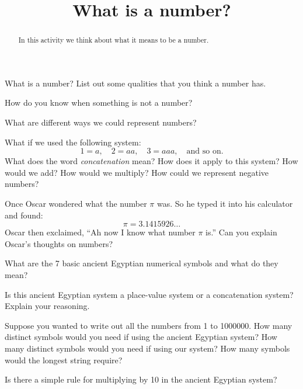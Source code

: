 \documentclass{ximera}
\title{What is a number?}
\begin{document}
\begin{abstract}
In this activity we think about what it means to be a number.
\end{abstract}
\maketitle

\begin{question}
What is a number? List out some qualities that you think a number has.
\end{question}

\begin{question}
How do you know when something is not a number?
\end{question}

\begin{question}
What are different ways we could represent numbers?
\end{question}

\begin{question}
What if we used the following system:
\[
1 = a, \quad 2 = aa, \quad 3 = aaa, \quad\text{and so on.}
\]
What does the word \textit{concatenation} mean? How does it apply to
this system?  How would we add? How would we multiply? How could we
represent negative numbers?
\end{question}


\begin{question}
Once Oscar wondered what the number $\pi$ was. So he typed it into his
calculator and found:
\[
\pi = 3.1415926\dots
\]
Oscar then exclaimed, ``Ah now I know what number $\pi$ is.'' Can you
explain Oscar's thoughts on numbers?
\end{question}


\begin{exercise}
What are the 7 basic ancient Egyptian numerical symbols and what do
they mean?
\end{exercise}


\begin{question}
Is this ancient Egyptian system a place-value system or a
concatenation system? Explain your reasoning.
\end{question}


\begin{question}
Suppose you wanted to write out all the numbers from 1 to 1000000. How
many distinct symbols would you need if using the ancient Egyptian
system? How many distinct symbols would you need if using our system?
How many symbols would the longest string require? 
\end{question}

\begin{question}
Is there a simple rule for multiplying by 10 in the ancient Egyptian system?
\end{question}
\end{document}
